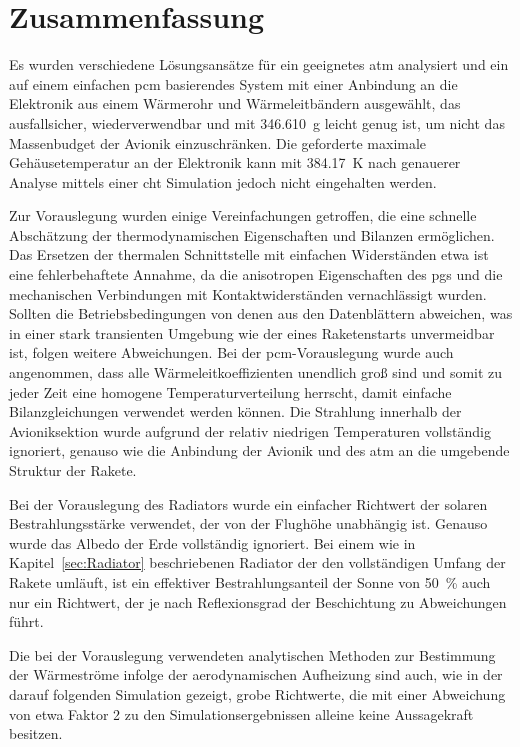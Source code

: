 \chapter{Zusammenfassung}
\label{chap:Zusammenfassung}

Es wurden verschiedene Lösungsansätze für ein geeignetes \ac{atm} analysiert und ein auf einem einfachen \ac{pcm} basierendes System
mit einer Anbindung an die Elektronik aus einem Wärmerohr und Wärmeleitbändern
ausgewählt, das ausfallsicher, wiederverwendbar und mit \SI{346,610}{\gram} leicht genug ist, um nicht das Massenbudget der Avionik einzuschränken.
Die geforderte maximale Gehäusetemperatur an der Elektronik kann mit \SI{384,17}{\kelvin} nach genauerer Analyse mittels einer \ac{cht} Simulation
jedoch nicht eingehalten werden.

Zur Vorauslegung wurden einige Vereinfachungen getroffen, die eine schnelle Abschätzung der thermodynamischen Eigenschaften
und Bilanzen ermöglichen.
Das Ersetzen der thermalen Schnittstelle mit einfachen Widerständen etwa ist eine fehlerbehaftete Annahme, da die anisotropen Eigenschaften des \ac{pgs} und
die mechanischen
Verbindungen mit Kontaktwiderständen vernachlässigt wurden. Sollten die Betriebsbedingungen von denen aus den Datenblättern abweichen, was in einer
stark transienten Umgebung wie der eines Raketenstarts unvermeidbar ist, folgen weitere Abweichungen.
Bei der \ac{pcm}-Vorauslegung wurde auch angenommen, dass alle Wärmeleitkoeffizienten unendlich groß sind und somit zu jeder Zeit
eine homogene Temperaturverteilung herrscht, damit einfache Bilanzgleichungen verwendet werden können.
Die Strahlung innerhalb der Avioniksektion wurde aufgrund der relativ niedrigen Temperaturen vollständig ignoriert, genauso wie
die Anbindung der Avionik und des \ac{atm} an die umgebende Struktur der Rakete.

Bei der Vorauslegung des Radiators wurde ein einfacher Richtwert der solaren Bestrahlungsstärke verwendet, der von der Flughöhe unabhängig ist.
Genauso wurde das Albedo der Erde vollständig ignoriert.
Bei einem wie in Kapitel~\ref{sec:Radiator} beschriebenen Radiator der den vollständigen Umfang der Rakete umläuft, ist ein effektiver Bestrahlungsanteil der Sonne von
\SI{50}{\percent} auch nur ein Richtwert, der je nach Reflexionsgrad der Beschichtung zu Abweichungen führt.

Die bei der Vorauslegung verwendeten analytischen Methoden zur Bestimmung der Wärmeströme infolge der aerodynamischen Aufheizung sind auch,
wie in der darauf folgenden Simulation gezeigt, grobe Richtwerte, die mit einer Abweichung von etwa Faktor 2 zu den Simulationsergebnissen
alleine keine Aussagekraft besitzen.

